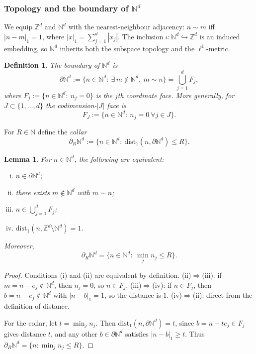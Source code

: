 \documentclass[10pt]{amsart}
\newcommand{\Z}{{\mathbb{Z}}}
\newcommand{\N}{{\mathbb{N}}}
\newcommand{\1}{{\mathbb{I}}}
\newcommand{\dist}{\mathrm{dist}}
\numberwithin{equation}{section}
\newtheorem{lemma}[theorem]{Lemma}%
\newtheorem{definition}[theorem]{Definition}%
\begin{document}
\subsubsection{Topology and the boundary of $\N^d$}
\label{subsec:topology}

We equip $\Z^d$ and $\N^d$ with the nearest-neighbour adjacency: $n\sim m$ iff $|n-m|_1=1$, where $|x|_1 = \sum_{j=1}^d |x_j|$. The inclusion $\iota:\N^d\hookrightarrow\Z^d$ is an induced embedding, so $\N^d$ inherits both the subspace topology and the $\ell^1$-metric.

\begin{definition}
The \emph{boundary} of $\N^d$ is
\[
\partial\N^d := \{n\in\N^d:\ \exists\, m\notin \N^d,\ m\sim n\}
= \bigcup_{j=1}^d F_j,
\]
where $F_j := \{n\in\N^d:\ n_j=0\}$ is the $j$th coordinate face. More generally, for $J\subset\{1,\dots,d\}$ the codimension-$|J|$ face is
\[
F_J := \{n\in\N^d:\ n_j=0 \ \forall j\in J\}.
\]
\end{definition}

For $R\in\N$ define the \emph{collar}
\[
\partial_R\N^d := \{n\in\N^d:\ \dist_1(n,\partial\N^d)\le R\}.
\]

\begin{lemma}
For $n\in\N^d$, the following are equivalent:
\begin{enumerate}[(i)]
\item $n\in \partial\N^d$;
\item there exists $m\notin\N^d$ with $m\sim n$;
\item $n\in \bigcup_{j=1}^d F_j$;
\item $\dist_1(n,\Z^d\setminus\N^d)=1$.
\end{enumerate}
Moreover,
\[
\partial_R\N^d = \{n\in\N^d:\ \min_j n_j \le R\}.
\]
\end{lemma}

\begin{proof}
Conditions (i) and (ii) are equivalent by definition.
(ii)$\Rightarrow$(iii): if $m=n-e_j\notin \N^d$, then $n_j=0$, so $n\in F_j$.
(iii)$\Rightarrow$(iv): if $n\in F_j$, then $b=n-e_j\notin\N^d$ with $|n-b|_1=1$, so the distance is $1$.
(iv)$\Rightarrow$(ii): direct from the definition of distance.

For the collar, let $t=\min_j n_j$. Then $\dist_1(n,\partial\N^d)=t$, since $b=n-te_j\in F_j$ gives distance $t$, and any other $b\in\partial\N^d$ satisfies $|n-b|_1\ge t$. Thus $\partial_R\N^d=\{n:\min_j n_j\le R\}$.
\end{proof}
\end{document}
